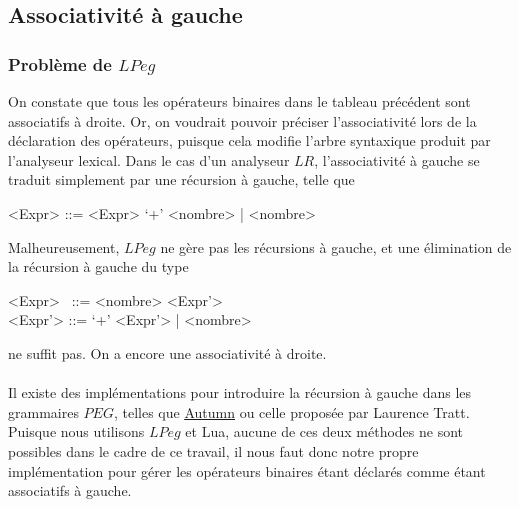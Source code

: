 \documentclass{article}
\begin{document}
\subsection{Associativité à gauche}
\subsubsection{Problème de $LPeg$}
On constate que tous les opérateurs binaires dans le tableau précédent sont associatifs à droite. Or, on voudrait pouvoir préciser l'associativité lors de la déclaration des opérateurs, puisque cela modifie l'arbre syntaxique produit par l'analyseur lexical. Dans le cas d'un analyseur $LR$, l'associativité à gauche se traduit simplement par une récursion à gauche, telle que
\begin{grammar}
	<Expr> ::= <Expr> `+' <nombre> | <nombre>
\end{grammar}
Malheureusement, $LPeg$ ne gère pas les récursions à gauche, et une élimination de la récursion à gauche du type
\begin{grammar}
<Expr> \ ::= <nombre> <Expr'> \\
<Expr'> ::= `+' <Expr'> | <nombre>
\end{grammar}
ne suffit pas. On a encore une associativité à droite. \\ \\
Il existe des implémentations pour introduire la récursion à gauche dans les grammaires $PEG$, telles que \underline{\href{https://github.com/norswap/whimsy/blob/master/doc/autumn/README.md}{Autumn}}\textsuperscript{\cite{autumn}} ou celle proposée par Laurence Tratt\textsuperscript{\cite{directLeftRecursive}}. Puisque nous utilisons $LPeg$ et Lua, aucune de ces deux méthodes ne sont possibles dans le cadre de ce travail, il nous faut donc notre propre implémentation pour gérer les opérateurs binaires étant déclarés comme étant associatifs à gauche.
\end{document}
